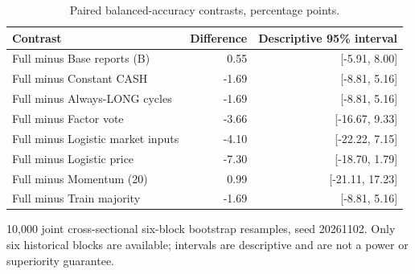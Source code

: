 \begin{table}[htbp]
\centering\small
\caption{Paired balanced-accuracy contrasts, percentage points.}
\label{tab:r1_common_intervals}
\setlength{\tabcolsep}{3.5pt}
\begin{tabular}{lrr}
\hline
Contrast & Difference & Descriptive 95\% interval \\
\hline
Full minus Base reports (B) & 0.55 & [-5.91, 8.00] \\
Full minus Constant CASH & -1.69 & [-8.81, 5.16] \\
Full minus Always-LONG cycles & -1.69 & [-8.81, 5.16] \\
Full minus Factor vote & -3.66 & [-16.67, 9.33] \\
Full minus Logistic market inputs & -4.10 & [-22.22, 7.15] \\
Full minus Logistic price & -7.30 & [-18.70, 1.79] \\
Full minus Momentum (20) & 0.99 & [-21.11, 17.23] \\
Full minus Train majority & -1.69 & [-8.81, 5.16] \\
\hline
\end{tabular}
\par\smallskip\footnotesize 10,000 joint cross-sectional six-block bootstrap resamples, seed 20261102. Only six historical blocks are available; intervals are descriptive and are not a power or superiority guarantee.
\end{table}
